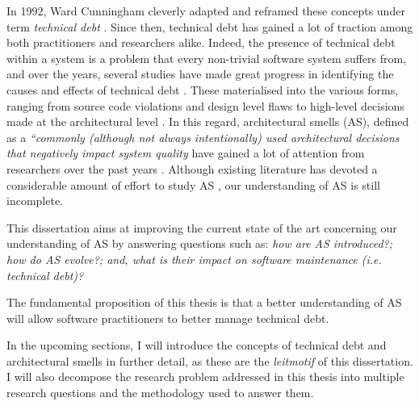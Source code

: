 In 1992, Ward Cunningham cleverly adapted and reframed these concepts under term \emph{technical debt} \cite{Cunningham1992}.
Since then, technical debt has gained a lot of traction among both practitioners and researchers alike.
Indeed, the presence of technical debt within a system is a problem that every non-trivial software system suffers from, and over the years, several studies have made great progress in identifying the causes and effects of technical debt \cite{Brown2010,Kruchten2012,Lehman1979}.
These materialised into the various forms, ranging from source code violations \cite{Letouzey2012,Curtis2012} and design level flaws \cite{Marinescu2012} to high-level decisions made at the architectural level \cite{Ernst2015,Yli-Huumo2014}.
In this regard, architectural smells (AS), defined as a \emph{``commonly (although not always intentionally) used architectural decisions that negatively impact system quality} \cite{Garcia2009} have gained a lot of attention from researchers over the past years \cite{Verdecchia2018}.
Although existing literature has devoted a considerable amount of effort to study AS \cite{Mo2015,Le2016,Arcelli2016}, our understanding of AS is still incomplete.

This dissertation aims at improving the current state of the art concerning our understanding of AS by answering questions such as: \emph{how are AS introduced?; how do AS evolve?; and, what is their impact on software maintenance (i.e. technical debt)?}

The fundamental proposition of this thesis is that a better understanding of AS will allow software practitioners to better manage technical debt.

In the upcoming sections, I will introduce the concepts of technical debt and architectural smells in further detail, as these are the \emph{leitmotif} of this dissertation.
I will also decompose the research problem addressed in this thesis into multiple research questions and the methodology used to answer them.


